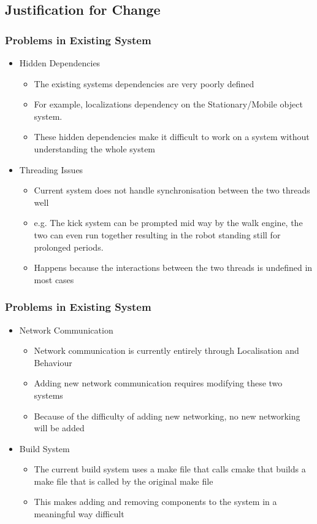 \documentclass{beamer}
\begin{document}
\subsection{Justification for Change}
\begin{frame}
	\frametitle{Problems in Existing System}
	\begin{itemize}
		\item Hidden Dependencies
			\begin{itemize}
				\item The existing systems dependencies are very poorly defined
				\item For example, localizations dependency on the Stationary/Mobile object system.
				\item These hidden dependencies make it difficult to work on a system without understanding the whole system
			\end{itemize}
	
		\item Threading Issues
			\begin{itemize}
				\item Current system does not handle synchronisation between the two threads well
				\item e.g. The kick system can be prompted mid way by the walk engine, the two can even run together resulting in the robot standing still for prolonged periods.
				\item Happens because the interactions between the two threads is undefined in most cases
			\end{itemize}
	\end{itemize}
\end{frame}

\begin{frame}
	\frametitle{Problems in Existing System}
	\begin{itemize}			
		\item Network Communication
			\begin{itemize}
				\item Network communication is currently entirely through Localisation and Behaviour
				\item Adding new network communication requires modifying these two systems
				\item Because of the difficulty of adding new networking, no new networking will be added
			\end{itemize}
			
		\item Build System
			\begin{itemize}
				\item The current build system uses a make file that calls cmake that builds a make file that is called by the original make file
				\item This makes adding and removing components to the system in a meaningful way difficult
			\end{itemize}
	\end{itemize}
\end{frame}
\end{document}

